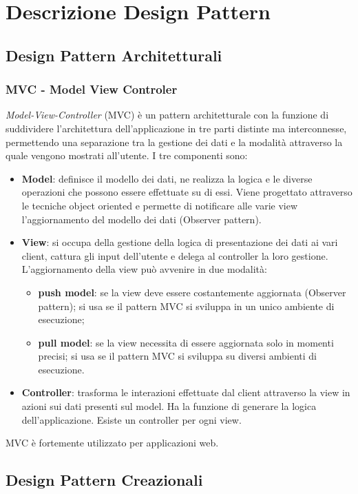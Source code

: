 \section{Descrizione Design Pattern}

\subsection{Design Pattern Architetturali}

\subsubsection{MVC - Model View Controler}
\textit{Model-View-Controller} (MVC) è un pattern architetturale con la funzione di suddividere l’architettura dell’applicazione in tre parti distinte ma interconnesse, permettendo una separazione tra la gestione dei dati e la modalità attraverso la quale vengono mostrati all’utente.
I tre componenti sono:
\begin{itemize}
	\item \textbf{Model}: definisce il modello dei dati, ne realizza la logica e le diverse operazioni che possono essere effettuate su di essi. Viene progettato attraverso le tecniche object oriented e permette di notificare alle varie view l’aggiornamento del modello dei dati (Observer pattern).
	\item \textbf{View}: si occupa della gestione della logica di presentazione dei dati ai vari client, cattura gli input dell'utente e delega al controller la loro gestione. L’aggiornamento della view può avvenire in due modalità:
	\begin{itemize}
		\item \textbf{push model}: se la view deve essere costantemente aggiornata (Observer pattern); si usa se il pattern MVC si sviluppa in un unico ambiente di esecuzione;
		\item \textbf{pull model}: se la view necessita di essere aggiornata solo in momenti precisi; si usa se il pattern MVC si sviluppa su diversi ambienti di esecuzione.
	\end{itemize}
	\item \textbf{Controller}: trasforma le interazioni effettuate dal client attraverso la view in azioni sui dati presenti sul model. Ha la funzione di generare la logica dell’applicazione. Esiste un controller per ogni view.
\end{itemize}
MVC è fortemente utilizzato per applicazioni web.

\subsection{Design Pattern Creazionali}

